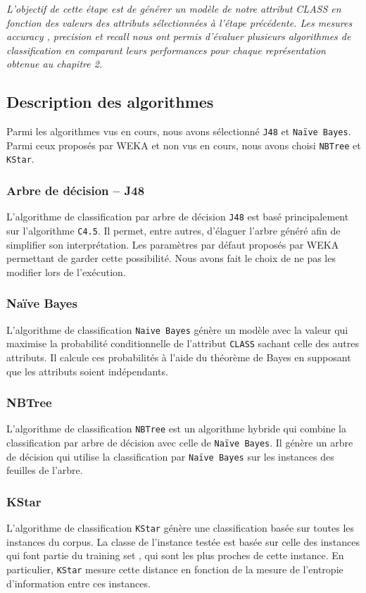 \textit{L’objectif de cette étape est de générer un modèle de notre attribut CLASS en fonction des valeurs des attributs sélectionnées à l’étape précédente. Les mesures \og accuracy \fg{}, \og precision \fg{} et \og recall \fg{} nous ont permis d'évaluer plusieurs algorithmes de classification en comparant leurs performances pour chaque représentation obtenue au chapitre 2.}

\subsection{Description des algorithmes}
Parmi les algorithmes vus en cours, nous avons sélectionné \texttt{J48} et \texttt{Naïve Bayes}. Parmi ceux proposés par WEKA et non vus en cours, nous avons choisi \texttt{NBTree} et \texttt{KStar}.

\subsubsection{Arbre de décision -- J48}
L'algorithme de classification par arbre de décision \texttt{J48} est basé principalement sur l'algorithme \texttt{C4.5}. Il permet, entre autres, d'élaguer l'arbre généré afin de simplifier son interprétation. Les paramètres par défaut proposés par WEKA permettant de garder cette possibilité. Nous avons fait le choix de ne pas les modifier lors de l'exécution.

\subsubsection{Naïve Bayes}
L'algorithme de classification \texttt{Naive Bayes} génère un modèle avec la valeur qui maximise la probabilité conditionnelle de l'attribut \texttt{CLASS} sachant celle des autres attributs. Il calcule ces probabilités à l'aide du théorème de Bayes en supposant que les attributs soient indépendants.

\subsubsection{NBTree}
L'algorithme de classification \texttt{NBTree} est un algorithme hybride qui combine la classification par arbre de décision avec celle de \texttt{Naïve Bayes}. Il génère un arbre de décision qui utilise la classification par \texttt{Naïve Bayes} sur les instances des feuilles de l'arbre.

\subsubsection{KStar}
L'algorithme de classification \texttt{KStar} génère une classification basée sur toutes les instances du corpus. La classe de l'instance testée est basée sur celle des instances qui font partie du \og training set \fg{}, qui sont les plus \og proches \fg{} de cette instance. En particulier, \texttt{KStar} mesure cette distance en fonction de la mesure de l'entropie d'information entre ces instances.

